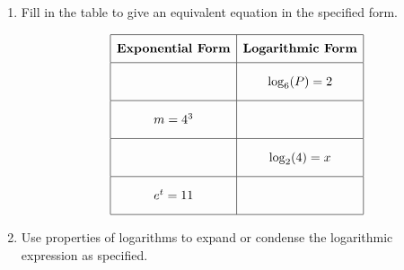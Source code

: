 \documentclass[11pt]{article}
\begin{document}
\begin{enumerate}

% 

\item %
\providecommand{\stxKnowl}{}\renewcommand{\stxKnowl}[1]{#1}
\providecommand{\stxOuttro}{}\renewcommand{\stxOuttro}[1]{#1}
\providecommand{\stxTitle}{}\renewcommand{\stxTitle}[1]{#1}
\renewcommand{\stxOuttro}[1]{}
\stxKnowl{
Fill in the table to give an equivalent equation in the specified form.

 \[\begin{array}{|c|c|} \hline \rule[-0.8em]{0pt}{2.2em} \textbf{Exponential Form} & \textbf{Logarithmic Form} \\ \hline \rule[-1.2em]{0pt}{3em} \hspace{3cm} & \log_{6}(P) = 2 \\ \hline \rule[-1.2em]{0pt}{3em} m = 4^{3} & \hspace{3cm} \\ \hline \rule[-1.2em]{0pt}{3em} \hspace{3cm} & \log_{2}(4) = x \\ \hline \rule[-1.2em]{0pt}{3em} e^{t} = 11 & \hspace{3cm} \\ \hline \end{array}\] 

\stxOuttro{
Solution

 \[\begin{array}{|c|c|} \hline \rule[-0.8em]{0pt}{2.2em} \textbf{Exponential Form} & \textbf{Logarithmic Form} \\ \hline \rule[-1.2em]{0pt}{3em} 6^{2} = P & \log_{6}(P) = 2 \\ \hline \rule[-1.2em]{0pt}{3em} m = 4^{3} & \log_{4}(m) = 3 \\ \hline \rule[-1.2em]{0pt}{3em} 2^{x} = 4 & \log_{2}(4) = x \\ \hline \rule[-1.2em]{0pt}{3em} e^{t} = 11 & \ln(11) = t \\ \hline \end{array}\] 

}
}

\newpage

% 

\item %
\providecommand{\stxKnowl}{}\renewcommand{\stxKnowl}[1]{#1}
\providecommand{\stxOuttro}{}\renewcommand{\stxOuttro}[1]{#1}
\providecommand{\stxTitle}{}\renewcommand{\stxTitle}[1]{#1}
\renewcommand{\stxOuttro}[1]{}
\stxKnowl{
Use properties of logarithms to expand or condense the logarithmic expression as specified.

}
\end{enumerate}
\end{document}
